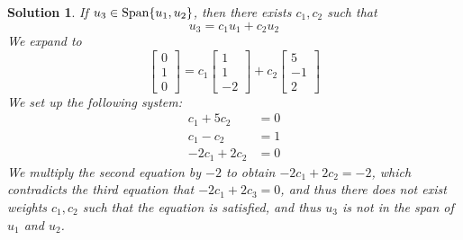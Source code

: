 \documentclass[11pt]{scrartcl}
\theoremstyle{dotlessP}
\newtheorem{sol}{Solution}[section]
\theoremstyle{dotlessN}
\DeclarePairedDelimiter\set{\{}{\}}
\newcommand{\spa}[1]{\text{Span}\set*{#1}}
\begin{document}
\begin{sol}
	If $u_3 \in \spa{u_1,u_2}$, then there exists $c_1, c_2$ such that
	\[
	u_3 = c_1u_1 + c_2u_2
	\]
	We expand to
	\[
	\begin{bmatrix}
		0 \\
		1 \\
		0
	\end{bmatrix} = 
	c_1
	\begin{bmatrix}
		1 \\
		1 \\
		-2
	\end{bmatrix} +
	c_2 
	\begin{bmatrix}
	5 \\
	-1 \\
	2
	\end{bmatrix}
	\] 
	We set up the following system:
	\begin{align*}
		c_1 + 5c_2 &= 0 \\
		c_1 - c_2 &= 1 \\
		-2c_1 + 2c_2 &= 0
	\end{align*}
	We multiply the second equation by $-2$ to obtain $-2c_1 + 2c_2 = -2$, which contradicts the third equation that $-2c_1 + 2c_3 = 0$, and thus there does not exist weights $c_1,c_2$ such that the equation is satisfied, and thus $u_3$ is not in the span of $u_1$ and $u_2$.
	\\


\end{sol}
\end{document}
